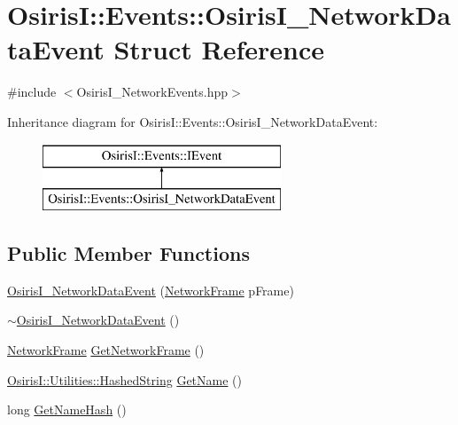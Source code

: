 \hypertarget{struct_osiris_i_1_1_events_1_1_osiris_i___network_data_event}{\section{Osiris\-I\-:\-:Events\-:\-:Osiris\-I\-\_\-\-Network\-Data\-Event Struct Reference}
\label{struct_osiris_i_1_1_events_1_1_osiris_i___network_data_event}
}


{\ttfamily \#include $<$Osiris\-I\-\_\-\-Network\-Events.\-hpp$>$}

Inheritance diagram for Osiris\-I\-:\-:Events\-:\-:Osiris\-I\-\_\-\-Network\-Data\-Event\-:\begin{figure}[H]
\begin{center}
\leavevmode
\includegraphics[height=2.000000cm]{struct_osiris_i_1_1_events_1_1_osiris_i___network_data_event}
\end{center}
\end{figure}
\subsection*{Public Member Functions}
\begin{DoxyCompactItemize}
\item 
\hyperlink{struct_osiris_i_1_1_events_1_1_osiris_i___network_data_event_a4b5801c2fafde5952f14912efb395264}{Osiris\-I\-\_\-\-Network\-Data\-Event} (\hyperlink{struct_osiris_i_1_1_network_frame}{Network\-Frame} p\-Frame)
\item 
\hyperlink{struct_osiris_i_1_1_events_1_1_osiris_i___network_data_event_aae12878b4da758088271d96804844756}{$\sim$\-Osiris\-I\-\_\-\-Network\-Data\-Event} ()
\item 
\hyperlink{struct_osiris_i_1_1_network_frame}{Network\-Frame} \hyperlink{struct_osiris_i_1_1_events_1_1_osiris_i___network_data_event_a7b9955a0c365be269feb88de79e08ba9}{Get\-Network\-Frame} ()
\item 
\hyperlink{class_osiris_i_1_1_utilities_1_1_hashed_string}{Osiris\-I\-::\-Utilities\-::\-Hashed\-String} \hyperlink{struct_osiris_i_1_1_events_1_1_osiris_i___network_data_event_a7a07f881e9e8914bcf413707da653f09}{Get\-Name} ()
\item 
long \hyperlink{struct_osiris_i_1_1_events_1_1_osiris_i___network_data_event_afa389e169d53036565c40d57892edc19}{Get\-Name\-Hash} ()
\end{DoxyCompactItemize}

